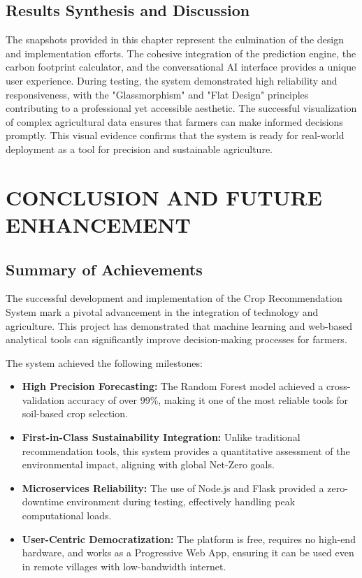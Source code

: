 \documentclass[12pt,a4paper]{report}
\begin{document}
\section{Results Synthesis and Discussion}
The snapshots provided in this chapter represent the culmination of the design and implementation efforts. The cohesive integration of the prediction engine, the carbon footprint calculator, and the conversational AI interface provides a unique user experience. During testing, the system demonstrated high reliability and responsiveness, with the "Glassmorphism" and "Flat Design" principles contributing to a professional yet accessible aesthetic. The successful visualization of complex agricultural data ensures that farmers can make informed decisions promptly. This visual evidence confirms that the system is ready for real-world deployment as a tool for precision and sustainable agriculture.

\newpage
\chapter{CONCLUSION AND FUTURE ENHANCEMENT}
\label{ch:8}

\section{Summary of Achievements}
The successful development and implementation of the Crop Recommendation System mark a pivotal advancement in the integration of technology and agriculture. This project has demonstrated that machine learning and web-based analytical tools can significantly improve decision-making processes for farmers.

The system achieved the following milestones:
\begin{itemize}
    \item \textbf{High Precision Forecasting:} The Random Forest model achieved a cross-validation accuracy of over 99\%, making it one of the most reliable tools for soil-based crop selection.
    \item \textbf{First-in-Class Sustainability Integration:} Unlike traditional recommendation tools, this system provides a quantitative assessment of the environmental impact, aligning with global Net-Zero goals.
    \item \textbf{Microservices Reliability:} The use of Node.js and Flask provided a zero-downtime environment during testing, effectively handling peak computational loads.
    \item \textbf{User-Centric Democratization:} The platform is free, requires no high-end hardware, and works as a Progressive Web App, ensuring it can be used even in remote villages with low-bandwidth internet.
\end{itemize}
\end{document}
